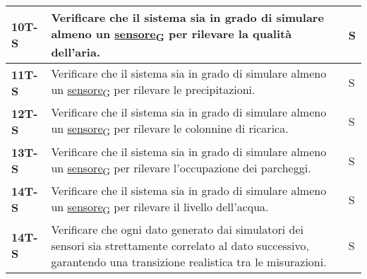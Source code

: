 \begin{longtable}{|>{\raggedright\arraybackslash}m{}|>{\raggedright\arraybackslash}m{}|>{\raggedright\arraybackslash}m{}|}
	\hline
	\textbf{10T-S}  & Verificare che il sistema sia in grado di simulare almeno un \href{https://7last.github.io/docs/pb/documentazione-interna/glossario\#sensore}{sensore\textsubscript{G}} per rilevare la qualità dell'aria.                                                                                                                                                                                               & S              \\
	\hline
	\textbf{11T-S}  & Verificare che il sistema sia in grado di simulare almeno un \href{https://7last.github.io/docs/pb/documentazione-interna/glossario\#sensore}{sensore\textsubscript{G}} per rilevare le precipitazioni.                                                                                                                                                                                                  & S              \\
	\hline
	\textbf{12T-S}  & Verificare che il sistema sia in grado di simulare almeno un \href{https://7last.github.io/docs/pb/documentazione-interna/glossario\#sensore}{sensore\textsubscript{G}} per rilevare le colonnine di ricarica.                                                                                                                                                                                           & S              \\
	\hline
	\textbf{13T-S}  & Verificare che il sistema sia in grado di simulare almeno un \href{https://7last.github.io/docs/pb/documentazione-interna/glossario\#sensore}{sensore\textsubscript{G}} per rilevare l'occupazione dei parcheggi.                                                                                                                                                                                        & S              \\
	\hline
	\textbf{14T-S}  & Verificare che il sistema sia in grado di simulare almeno un \href{https://7last.github.io/docs/pb/documentazione-interna/glossario\#sensore}{sensore\textsubscript{G}} per rilevare il livello dell'acqua.                                                                                                                                                                                              & S              \\
	\hline
	\textbf{14T-S}  & Verificare che ogni dato generato dai simulatori dei sensori sia strettamente correlato al dato successivo, garantendo una transizione realistica tra le misurazioni.                                                                                                                                                                                                                                    & S              \\

\end{longtable}
